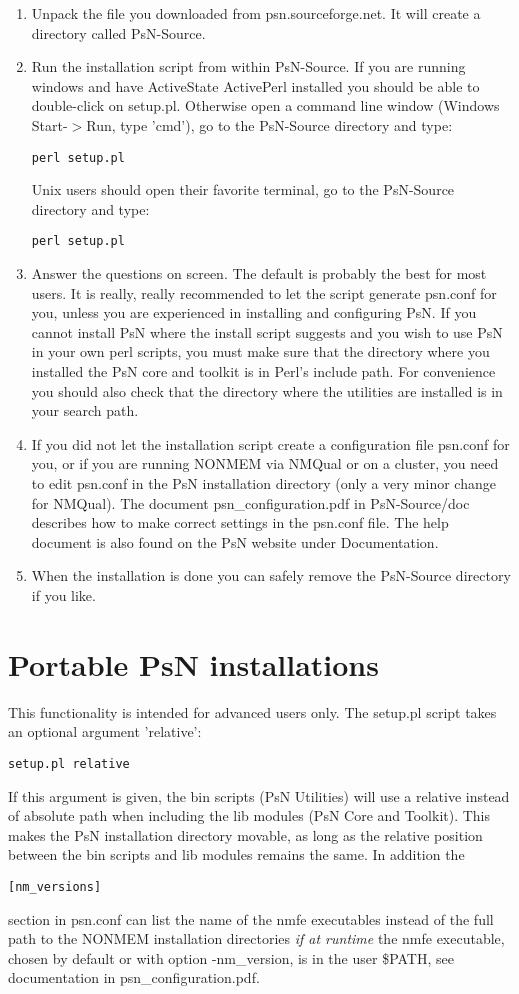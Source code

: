 \begin{enumerate}
\item Unpack the file you downloaded from psn.sourceforge.net. It will create a directory called PsN-Source.
\item Run the installation script from within PsN-Source. If you are running windows and have ActiveState ActivePerl installed you should be able to double-click on setup.pl. Otherwise open a command line window (Windows Start-$>$Run, type 'cmd'), go to the PsN-Source directory and type: 
\begin{verbatim}
perl setup.pl
\end{verbatim}
Unix users should open their favorite terminal, go to the PsN-Source directory and type:
\begin{verbatim}
perl setup.pl
\end{verbatim}
\item Answer the questions on screen. The default is probably the best for most users. It is really, really recommended to let the script generate psn.conf for you, unless you are experienced in installing and configuring PsN.
If you cannot install PsN where the install script suggests and you wish to use PsN in your own perl scripts, you must make sure that the directory where you installed the PsN core and toolkit is in Perl's include path. For convenience you should also check that the directory where the utilities are installed is in your search path. 
\item If you did not let the installation script create a configuration file psn.conf for you, or if you are running NONMEM via NMQual or on a cluster, you need to edit psn.conf in the PsN installation directory (only a very minor change for NMQual). The document psn\_configuration.pdf in PsN-Source/doc describes how to make correct settings in the psn.conf file. The help document is also found on the PsN website under Documentation.
\item When the installation is done you can safely remove the PsN-Source directory if you like. 
\end{enumerate}

\section{Portable PsN installations}
This functionality is intended for advanced users only. The setup.pl script
takes an optional argument 'relative':
\begin{verbatim}
setup.pl relative
\end{verbatim}
If this argument is given, the bin scripts (PsN Utilities) 
will use a relative instead of 
absolute path when
including the lib modules (PsN Core and Toolkit). 
This makes the PsN installation directory movable,
as long as the relative position between the bin scripts and lib modules
remains the same. In addition the
\begin{verbatim}
[nm_versions]
\end{verbatim}
section in psn.conf can list the name of the nmfe executables instead of
the full path to the NONMEM installation directories 
\emph{if at runtime}
the nmfe executable, chosen by default or with option -nm\_version,
is in the user \$PATH, 
see documentation in psn\_configuration.pdf.
